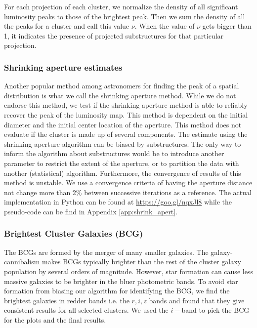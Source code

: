 For each projection of each cluster, we normalize the density of all significant 
luminosity peaks to those of the brightest peak. 
Then we sum the density of all the peaks for a cluster and call this value
$\nu$. When the value of $\nu$ gets bigger than 1, it indicates the presence 
of projected substructures for that particular projection.

\subsubsection{Shrinking aperture estimates}

Another popular method among astronomers for finding the peak of a spatial
distribution is what we call the shrinking aperture method.
While we do not endorse this method,
we test if the shrinking aperture method is able to reliably recover the 
peak of the luminosity map.
This method is dependent on the initial diameter and the initial center 
location of the aperture.
This method does not evaluate if the cluster is made up of
several components.
The estimate using the shrinking aperture algorithm can be biased by
substructures. The only way to inform the algorithm about substructures would
be to introduce another parameter to restrict the extent of the aperture, or to
partition the data with another (statistical) algorithm.
Furthermore, the convergence of results of this method is unstable. We use a
convergence criteria of having the aperture distance not change more than 2\% 
between successive iterations as a reference. The actual implementation in
Python can be found at \href{https://goo.gl/nqxJl8}{https://goo.gl/nqxJl8} while
the pseudo-code can be find in Appendix \ref{app:shrink_apert}.

\subsubsection{Brightest Cluster Galaxies (BCG)}
The BCGs are formed by the merger of many smaller
galaxies. The galaxy-cannibalism makes BCGs typically brighter than the rest of 
the cluster galaxy population by several orders of magnitude. 
However, star formation can cause
less massive galaxies to be brighter in the bluer photometric bands.
To avoid star formation from biasing our algorithm for identifying the
BCG, we find the brightest galaxies in redder bands i.e. the $r, i, z$
bands and found that they give consistent results for all selected clusters. 
We used the $i-$band to pick the BCG for the plots and the final results. 

